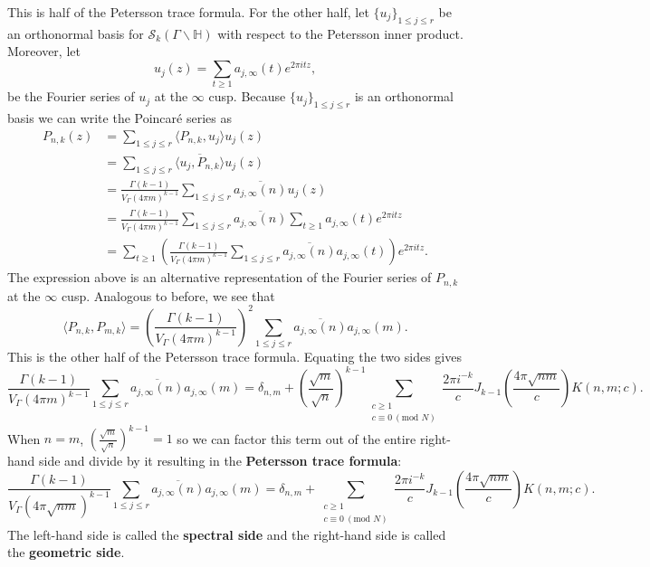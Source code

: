 \documentclass[12pt]{book}
\theoremstyle{definition}\newframedtheorem{method}{Method}
\newcommand{\tmod}[1]{\ \left(\text{mod }#1\right)}
\newcommand{\mc}{\mathcal}
\renewcommand{\H}{\mathbb{H}}
\renewcommand{\d}{\delta}
\newcommand{\G}{\Gamma}
\newcommand{\<}{\langle}
\renewcommand{\>}{\rangle}
\newcommand{\conj}{\overline}
\newcommand{\GH}{\G\backslash\H}
\begin{document}
      This is half of the Petersson trace formula. For the other half, let $\{u_{j}\}_{1 \le j \le r}$ be an orthonormal basis for $\mc{S}_{k}(\GH)$ with respect to the Petersson inner product. Moreover, let
      \[
        u_{j}(z) = \sum_{t \ge 1}a_{j,\infty}(t)e^{2\pi itz},
      \]
      be the Fourier series of $u_{j}$ at the $\infty$ cusp. Because $\{u_{j}\}_{1 \le j \le r}$ is an orthonormal basis we can write the Poincar\'e series as
      \begin{align*}
        P_{n,k}(z) &= \sum_{1 \le j \le r}\<P_{n,k},u_{j}\>u_{j}(z) \\
        &= \sum_{1 \le j \le r}\conj{\<u_{j},P_{n,k}\>}u_{j}(z) \\
        &= \frac{\G(k-1)}{V_{\G}(4\pi m)^{k-1}}\sum_{1 \le j \le r}\conj{a_{j,\infty}(n)}u_{j}(z) \\
        &= \frac{\G(k-1)}{V_{\G}(4\pi m)^{k-1}}\sum_{1 \le j \le r}\conj{a_{j,\infty}(n)}\sum_{t \ge 1}a_{j,\infty}(t)e^{2\pi itz} \\
        &= \sum_{t \ge 1}\left(\frac{\G(k-1)}{V_{\G}(4\pi m)^{k-1}}\sum_{1 \le j \le r}\conj{a_{j,\infty}(n)}a_{j,\infty}(t)\right)e^{2\pi itz}.
      \end{align*}
      The expression above is an alternative representation of the Fourier series of $P_{n,k}$ at the $\infty$ cusp. Analogous to before, we see that
      \[
        \<P_{n,k},P_{m,k}\> = \left(\frac{\G(k-1)}{V_{\G}(4\pi m)^{k-1}}\right)^{2}\sum_{1 \le j \le r}\conj{a_{j,\infty}(n)}a_{j,\infty}(m).
      \]
      This is the other half of the Petersson trace formula. Equating the two sides gives
      \[
        \frac{\G(k-1)}{V_{\G}(4\pi m)^{k-1}}\sum_{1 \le j \le r}\conj{a_{j,\infty}(n)}a_{j,\infty}(m) = \d_{n,m}+\left(\frac{\sqrt{m}}{\sqrt{n}}\right)^{k-1}\sum_{\substack{c \ge 1 \\ c \equiv 0 \tmod{N}}}\frac{2\pi i^{-k}}{c}J_{k-1}\left(\frac{4\pi\sqrt{nm}}{c}\right)K(n,m;c).
      \]
      When $n = m$, $\left(\frac{\sqrt{m}}{\sqrt{n}}\right)^{k-1} = 1$ so we can factor this term out of the entire right-hand side and divide by it resulting in the \textbf{Petersson trace formula}:
      \[
        \frac{\G(k-1)}{V_{\G}(4\pi\sqrt{nm})^{k-1}}\sum_{1 \le j \le r}\conj{a_{j,\infty}(n)}a_{j,\infty}(m) = \d_{n,m}+\sum_{\substack{c \ge 1 \\ c \equiv 0 \tmod{N}}}\frac{2\pi i^{-k}}{c}J_{k-1}\left(\frac{4\pi\sqrt{nm}}{c}\right)K(n,m;c).
      \]
      The left-hand side is called the \textbf{spectral side} and the right-hand side is called the \textbf{geometric side}.
\end{document}
